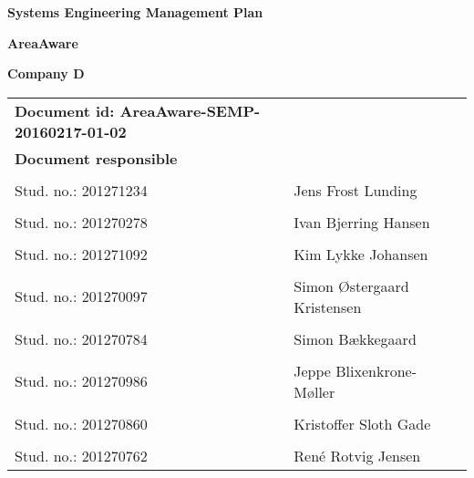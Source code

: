 
\centerline{\Huge\bfseries\color{ThemeColor} Systems Engineering Management Plan} 

\vspace{1em}
\centerline{\Large\bfseries\color{BlackColor} AreaAware} 

\vspace{5em}
\centerline{\large\bfseries\color{BlackColor}Company D} 

\begin{center}
   \begin{tabular}{ l l l}
   \textbf{Document id: AreaAware-SEMP-20160217-01-02} && \\
   \textbf{Document responsible} &  & \\
   & & \\
   Stud. no.: 201271234 & Jens Frost Lunding & \\\hline
   & & \\
   Stud. no.: 201270278 & Ivan Bjerring Hansen & \\\hline
   & & \\
   Stud. no.: 201271092 & Kim Lykke Johansen & \\\hline
   & & \\
   Stud. no.: 201270097 & Simon Østergaard Kristensen & \\\hline
   & & \\
   Stud. no.: 201270784  & Simon Bækkegaard & \\\hline
   & & \\
   Stud. no.:  201270986 & Jeppe Blixenkrone-Møller & \\\hline
   & & \\
   Stud. no.:  201270860 & Kristoffer Sloth Gade & \\\hline
   & & \\
   Stud. no.:  201270762 & René Rotvig Jensen & \\\hline
   \end{tabular}
\end{center}
\thispagestyle{empty} %
\restoregeometry
